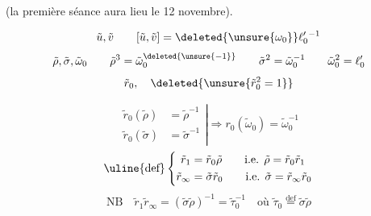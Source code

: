 (la première séance aura lieu le 12 novembre).


\[
\tilde u,\tilde v\qquad
[\tilde u,\tilde v]=\deleted{\unsure{\omega_0}}\ell_0'{}^{-1}
\]
\[
\tilde\rho,\tilde\sigma,\tilde\omega_0\qquad
\tilde\rho^3=\tilde\omega_0^{\deleted{\unsure{-1}}}
\qquad
\tilde\sigma^2=\tilde\omega_0^{-1}
\qquad
\tilde\omega_0^2=\ell'_0
\]
\[
\tilde r_0,\quad\deleted{\unsure{\tilde r_0^2=1}}
\]


\[
\left.\begin{aligned}
\tilde r_0(\tilde\rho)&=\tilde\rho^{-1}\\
\tilde r_0(\tilde\sigma)&=\tilde\sigma^{-1}
\end{aligned}\right|\Longrightarrow r_0(\tilde\omega_0)=\tilde\omega_0^{-1}
\]
\[
\uline{\text{def}}\left\{\begin{aligned}
\tilde r_1&=\tilde r_0\tilde\rho\qquad\text{i.e. }\tilde\rho=\tilde r_0\tilde r_1\\
\tilde r_\infty&=\tilde\sigma\tilde r_0\qquad\text{i.e. }\tilde\sigma=\tilde r_\infty\tilde r_0
\end{aligned}\right.
\]
\[
\text{NB}\quad\tilde r_1\tilde r_\infty=(\tilde\sigma\tilde\rho)^{-1}=\tilde\tau_0^{-1}
\quad\text{où }\tilde\tau_0\overset{\mathrm{def}}=\tilde\sigma\tilde\rho
\]

